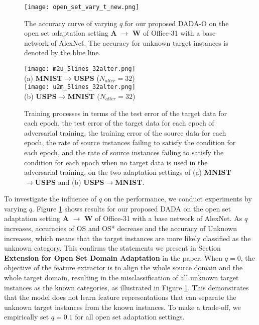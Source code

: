 \documentclass[letterpaper]{article} \usepackage{aaai20}  \usepackage{times}  \usepackage{helvet} \usepackage{courier}  \usepackage[hyphens]{url}  \usepackage{graphicx} \urlstyle{rm} \def\UrlFont{\rm}  \usepackage{graphicx}  \frenchspacing  \setlength{\pdfpagewidth}{8.5in}  \setlength{\pdfpageheight}{11in}
\begin{document}
\begin{figure}[ht]
	\begin{center}
\texttt{[image: open\_set\_vary\_t\_new.png]}
	\end{center}
	\caption{The accuracy curve of varying $q$ for our proposed DADA-O on the open set adaptation setting \textbf{A} $\rightarrow$ \textbf{W} of Office-31 with a base network of AlexNet. The accuracy for unknown target instances is denoted by the blue line.}
	\label{fig:open_set_vary_t}
\end{figure}

\begin{figure*}[!t]
	\begin{center} 


\texttt{[image: m2u\_5lines\_32alter.png]} \\
		(a) \textbf{MNIST}$\rightarrow$\textbf{USPS} ($N_{alter}=32$) \\
\texttt{[image: u2m\_5lines\_32alter.png]} \\
		(b) \textbf{USPS}$\rightarrow$\textbf{MNIST} ($N_{alter}=32$) \\
	\end{center}
	\caption{Training processes in terms of the test error of the target data for each epoch, the test error of the target data for each epoch of adversarial training, the training error of the source data for each epoch, the rate of source instances failing to satisfy the condition for each epoch, and the rate of source instances failing to satisfy the condition for each epoch when no target data is used in the adversarial training, on the two adaptation settings of (a) \textbf{MNIST}$\rightarrow$\textbf{USPS} and (b) \textbf{USPS}$\rightarrow$\textbf{MNIST}.}
	\label{fig:training_process}
\end{figure*} 

To investigate the influence of $q$ on the performance, we conduct experiments by varying $q$. Figure \ref{fig:open_set_vary_t} shows results for our proposed DADA on the open set adaptation setting \textbf{A} $\rightarrow$ \textbf{W} of Office-31 with a base network of AlexNet. As $q$ increases, accuracies of OS and OS* decrease and the accuracy of Unknown increases, which means that the target instances are more likely classified as the unknown category. This confirms the statements we present in Section \textbf{Extension for Open Set Domain Adaptation} in the paper. When $q=0$, the objective of the feature extractor is to align the whole source domain and the whole target domain, resulting in the misclassification of all unknown target instances as the known categories, as illustrated in Figure \ref{fig:open_set_vary_t}. This demonstrates that the model does not learn feature representations that can separate the unknown target instances from the known instances. To make a trade-off, we empirically set $q=0.1$ for all open set adaptation settings.
\end{document}
